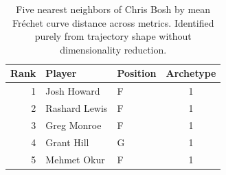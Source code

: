 \begin{table}[htbp]
  \centering\small
  \begin{tabular}{rllc}
    \toprule
    Rank & Player & Position & Archetype \\
    \midrule
    1 & Josh Howard & F & 1 \\
    2 & Rashard Lewis & F & 1 \\
    3 & Greg Monroe & F & 1 \\
    4 & Grant Hill & G & 1 \\
    5 & Mehmet Okur & F & 1 \\
    \bottomrule
  \end{tabular}
  \caption{Five nearest neighbors of Chris Bosh by mean Fr\'{e}chet curve distance across metrics. Identified purely from trajectory shape without dimensionality reduction.}
  \label{tab:Chris_Bosh_frechet_curve_neighbors}
\end{table}

